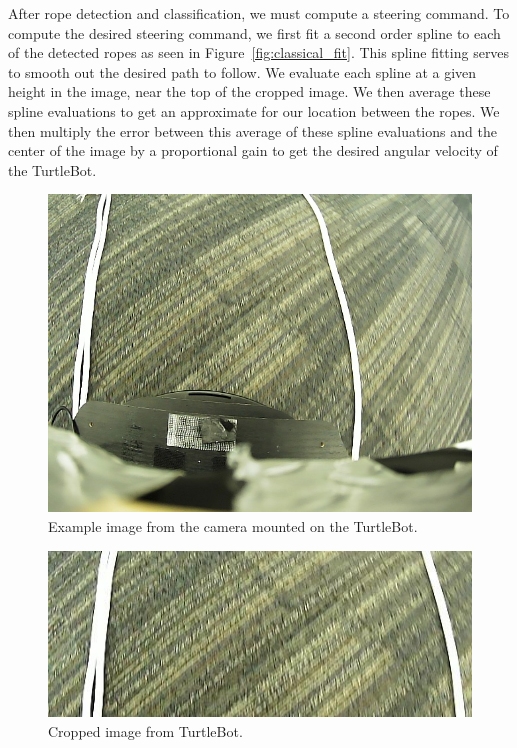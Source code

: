 After rope detection and classification, we must compute a steering command. To
compute the desired steering command, we first fit a second order spline to each
of the detected ropes as seen in Figure~\ref{fig:classical_fit}. This spline
fitting serves to smooth out the desired path to follow. We evaluate each spline
at a given height in the image, near the top of the cropped image. We then
average these spline evaluations to get an approximate for our location between
the ropes. We then multiply the error between this average of these spline
evaluations and the center of the image by a proportional gain to get the
desired angular velocity of the TurtleBot.

\begin{figure}
  \centering
  \includegraphics[scale=0.5]{figures/raw_img.png}
  \caption{Example image from the camera mounted on the TurtleBot.}
  \label{fig:raw_img}
\end{figure}

\begin{figure}
  \centering
  \includegraphics[scale=0.67]{figures/classical_crop.jpg}
  \caption{Cropped image from TurtleBot.}
  \label{fig:classical_crop}
\end{figure}

